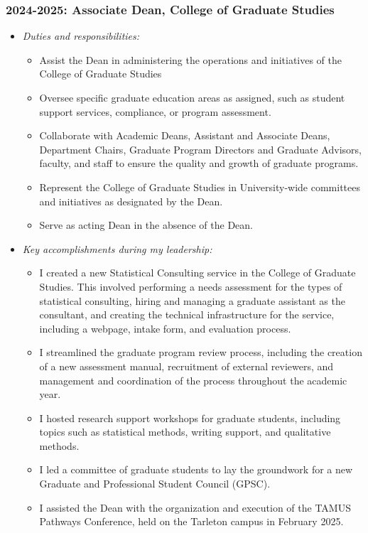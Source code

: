 \documentclass[article,10pt]{article}
\begin{document}
\subsubsection*{2024-2025: Associate Dean, College of Graduate Studies}
\label{sec:orge793e98}
\begin{itemize}
\item \emph{Duties and responsibilities:}
\begin{itemize}
\item Assist the Dean in administering the operations and initiatives of the College of Graduate Studies
\item Oversee specific graduate education areas as assigned, such as student support services, compliance, or program assessment.
\item Collaborate with Academic Deans, Assistant and Associate Deans, Department Chairs, Graduate Program Directors and Graduate Advisors, faculty, and staff to ensure the quality and growth of graduate programs.
\item Represent the College of Graduate Studies in University-wide committees and initiatives as designated by the Dean.
\item Serve as acting Dean in the absence of the Dean.
\end{itemize}

\item \emph{Key accomplishments during my leadership:}
\begin{itemize}
\item I created a new Statistical Consulting service in the College of Graduate Studies. This involved performing a needs assessment for the types of statistical consulting, hiring and managing a graduate assistant as the consultant, and creating the technical infrastructure for the service, including a webpage, intake form, and evaluation process.
\item I streamlined the graduate program review process, including the creation of a new assessment manual, recruitment of external reviewers, and management and coordination of the process throughout the academic year.
\item I hosted research support workshops for graduate students, including topics such as statistical methods, writing support, and qualitative methods.
\item I led a committee of graduate students to lay the groundwork for a new Graduate and Professional Student Council (GPSC).
\item I assisted the Dean with the organization and execution of the TAMUS Pathways Conference, held on the Tarleton campus in February 2025.
\end{itemize}
\end{itemize}
\end{document}
